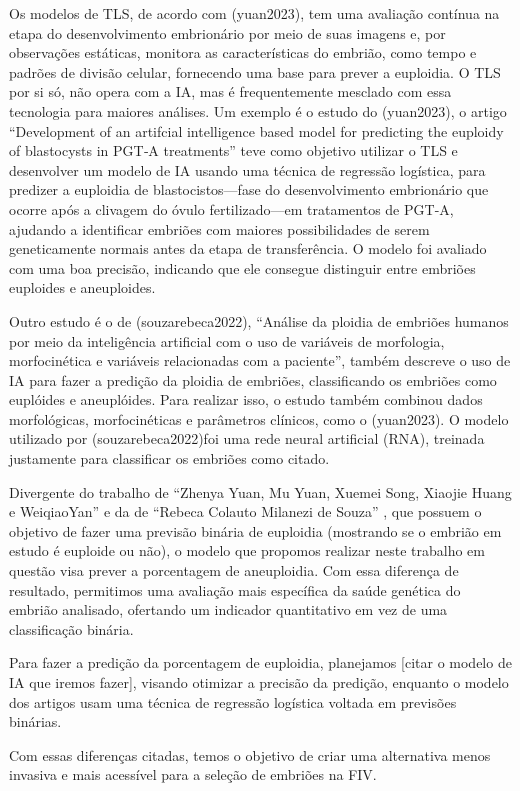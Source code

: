 Os modelos de TLS, de acordo com \citeonline(yuan2023), tem uma avaliação contínua na etapa do desenvolvimento embrionário por meio de suas imagens e, por observações estáticas, monitora as características do embrião, como tempo e padrões de divisão celular, fornecendo uma base para prever a euploidia. O TLS por si só, não opera com a IA, mas é frequentemente mesclado com essa tecnologia para maiores análises. Um exemplo é o estudo do \citeonline(yuan2023), o artigo “Development of an artifcial intelligence based model for predicting the euploidy of blastocysts in PGT‐A treatments” teve como objetivo utilizar o TLS e desenvolver um modelo de IA usando uma técnica de regressão logística, para predizer a euploidia de blastocistos—fase do desenvolvimento embrionário que ocorre após a clivagem do óvulo fertilizado—em tratamentos de PGT-A, ajudando a identificar embriões com maiores possibilidades de serem geneticamente normais antes da etapa de transferência. O modelo foi avaliado com uma boa precisão, indicando que ele consegue distinguir entre embriões euploides e aneuploides.

Outro estudo é o de \citeonline(souzarebeca2022), “Análise da ploidia de embriões humanos por meio da inteligência artificial com o uso de variáveis de morfologia, morfocinética e variáveis relacionadas com a paciente”, também descreve o uso de IA para fazer a predição da ploidia de embriões, classificando os embriões como euplóides e aneuplóides. Para realizar isso, o estudo também combinou dados morfológicas, morfocinéticas e parâmetros clínicos, como o \citeonline(yuan2023). O modelo utilizado por \citeonline(souzarebeca2022)foi uma rede neural artificial (RNA), treinada justamente para classificar os embriões como citado.

Divergente do trabalho de “Zhenya Yuan, Mu Yuan, Xuemei Song, Xiaojie Huang e WeiqiaoYan” \cite{yuan2023} e da de “Rebeca Colauto Milanezi de Souza” \cite{souzarebeca2022}, que possuem o objetivo de fazer uma previsão binária de euploidia (mostrando se o embrião em estudo é euploide ou não), o modelo que propomos realizar neste trabalho em questão visa prever a porcentagem de aneuploidia. Com essa diferença de resultado, permitimos uma avaliação mais específica da saúde genética do embrião analisado, ofertando um indicador quantitativo em vez de uma classificação binária.

Para fazer a predição da porcentagem de euploidia, planejamos [citar o modelo de IA que iremos fazer], visando otimizar a precisão da predição, enquanto o modelo dos artigos usam uma técnica de regressão logística voltada em previsões binárias.

Com essas diferenças citadas, temos o objetivo de criar uma alternativa menos invasiva e mais acessível para a seleção de embriões na FIV.










